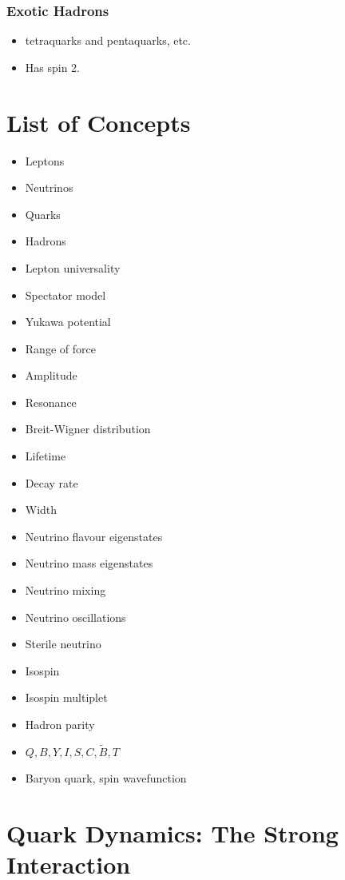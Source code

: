 \subsubsection{Exotic Hadrons}
\begin{itemize}
    \item tetraquarks and pentaquarks, etc. 
    \item Has spin 2. 
\end{itemize}

\section{List of Concepts}
\begin{itemize}
    \item Leptons
    \item Neutrinos
    \item Quarks 
    \item Hadrons 
    \item Lepton universality 
    \item Spectator model 
    \item Yukawa potential
    \item Range of force 
    \item Amplitude 
    \item Resonance
    \item Breit-Wigner distribution 
    \item Lifetime 
    \item Decay rate 
    \item Width 
    \item Neutrino flavour eigenstates 
    \item Neutrino mass eigenstates 
    \item Neutrino mixing 
    \item Neutrino oscillations
    \item Sterile neutrino
    \item Isospin 
    \item Isospin multiplet
    \item Hadron parity 
    \item $Q, B, Y, I, S, C, \tilde{B}, T$
    \item Baryon quark, spin wavefunction 
\end{itemize}


\section{Quark Dynamics: The Strong Interaction}
